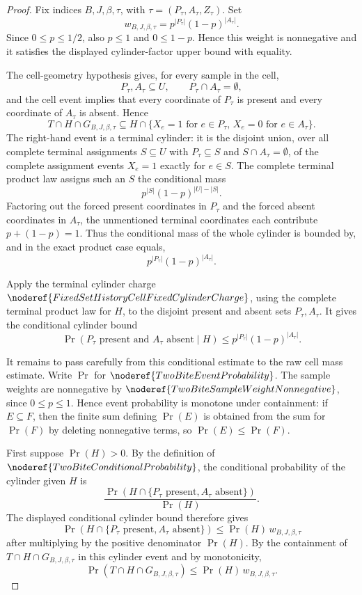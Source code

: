 \begin{proof}
Fix indices \(B,J,\beta,\tau\), with
\(\tau=(P_\tau,A_\tau,Z_\tau)\).  Set
\[
w_{B,J,\beta,\tau}=p^{|P_\tau|}(1-p)^{|A_\tau|}.
\]
Since \(0\le p\le 1/2\), also \(p\le1\) and \(0\le1-p\).  Hence this weight
is nonnegative and it satisfies the displayed cylinder-factor upper bound
with equality.

The cell-geometry hypothesis gives, for every sample in the cell,
\[
P_\tau,A_\tau\subseteq U,\qquad P_\tau\cap A_\tau=\emptyset,
\]
and the cell event implies that every coordinate of \(P_\tau\) is present
and every coordinate of \(A_\tau\) is absent.  Hence
\[
T\cap H\cap G_{B,J,\beta,\tau}
\subseteq
H\cap\{X_e=1\text{ for }e\in P_\tau,\,
      X_e=0\text{ for }e\in A_\tau\}.
\]
The right-hand event is a terminal cylinder: it is the disjoint union, over
all complete terminal assignments \(S\subseteq U\) with
\(P_\tau\subseteq S\) and \(S\cap A_\tau=\emptyset\), of the complete
assignment events \(X_e=1\) exactly for \(e\in S\).  The complete terminal
product law assigns such an \(S\) the conditional mass
\[
p^{|S|}(1-p)^{|U|-|S|}.
\]
Factoring out the forced present coordinates in \(P_\tau\) and the forced
absent coordinates in \(A_\tau\), the unmentioned terminal coordinates each
contribute \(p+(1-p)=1\).  Thus the conditional mass of the whole cylinder
is bounded by, and in the exact product case equals,
\[
p^{|P_\tau|}(1-p)^{|A_\tau|}.
\]

Apply the terminal cylinder charge
\(\noderef{FixedSetHistoryCellFixedCylinderCharge}\), using the complete
terminal product law for \(H\), to the disjoint present and absent sets
\(P_\tau,A_\tau\).  It gives the conditional cylinder bound
\[
\Pr(P_\tau\text{ present and }A_\tau\text{ absent}\mid H)
\le p^{|P_\tau|}(1-p)^{|A_\tau|}.
\]

It remains to pass carefully from this conditional estimate to the raw cell
mass estimate.  Write \(\Pr\) for
\(\noderef{TwoBiteEventProbability}\).  The sample weights are nonnegative
by \(\noderef{TwoBiteSampleWeightNonnegative}\), since \(0\le p\le1\).  Hence
event probability is monotone under containment: if \(E\subseteq F\), then
the finite sum defining \(\Pr(E)\) is obtained from the sum for \(\Pr(F)\)
by deleting nonnegative terms, so \(\Pr(E)\le\Pr(F)\).

First suppose \(\Pr(H)>0\).  By the definition of
\(\noderef{TwoBiteConditionalProbability}\), the conditional probability of
the cylinder given \(H\) is
\[
\frac{\Pr(H\cap\{P_\tau\text{ present},A_\tau\text{ absent}\})}{\Pr(H)}.
\]
The displayed conditional cylinder bound therefore gives
\[
\Pr(H\cap\{P_\tau\text{ present},A_\tau\text{ absent}\})
\le
\Pr(H)\,w_{B,J,\beta,\tau}
\]
after multiplying by the positive denominator \(\Pr(H)\).  By the containment
of \(T\cap H\cap G_{B,J,\beta,\tau}\) in this cylinder event and by
monotonicity,
\[
\Pr(T\cap H\cap G_{B,J,\beta,\tau})
\le \Pr(H)\,w_{B,J,\beta,\tau}.
\]


\end{proof}
